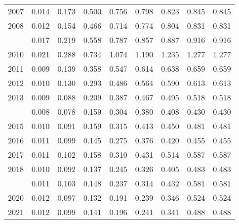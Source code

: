 \documentclass[
]{article}
\begin{document}
\begin{longtable}[t]{lrrrrrrrr}
2007 & 0.014 & 0.173 & 0.500 & 0.756 & 0.798 & 0.823 & 0.845 & 0.845\\
2008 & 0.012 & 0.154 & 0.466 & 0.714 & 0.774 & 0.804 & 0.831 & 0.831\\
\addlinespace
2009 & 0.017 & 0.219 & 0.558 & 0.787 & 0.857 & 0.887 & 0.916 & 0.916\\
2010 & 0.021 & 0.288 & 0.734 & 1.074 & 1.190 & 1.235 & 1.277 & 1.277\\
2011 & 0.009 & 0.139 & 0.358 & 0.547 & 0.614 & 0.638 & 0.659 & 0.659\\
2012 & 0.010 & 0.130 & 0.293 & 0.486 & 0.564 & 0.590 & 0.613 & 0.613\\
2013 & 0.009 & 0.088 & 0.209 & 0.387 & 0.467 & 0.495 & 0.518 & 0.518\\
\addlinespace
2014 & 0.008 & 0.078 & 0.159 & 0.304 & 0.380 & 0.408 & 0.430 & 0.430\\
2015 & 0.010 & 0.091 & 0.159 & 0.315 & 0.413 & 0.450 & 0.481 & 0.481\\
2016 & 0.011 & 0.099 & 0.145 & 0.275 & 0.376 & 0.420 & 0.455 & 0.455\\
2017 & 0.011 & 0.102 & 0.158 & 0.310 & 0.431 & 0.514 & 0.587 & 0.587\\
2018 & 0.010 & 0.092 & 0.137 & 0.245 & 0.326 & 0.405 & 0.483 & 0.483\\
\addlinespace
2019 & 0.011 & 0.103 & 0.148 & 0.237 & 0.314 & 0.432 & 0.581 & 0.581\\
2020 & 0.012 & 0.097 & 0.132 & 0.191 & 0.239 & 0.346 & 0.524 & 0.524\\
2021 & 0.012 & 0.099 & 0.141 & 0.196 & 0.241 & 0.341 & 0.488 & 0.488\\*
\end{longtable}
\end{document}
